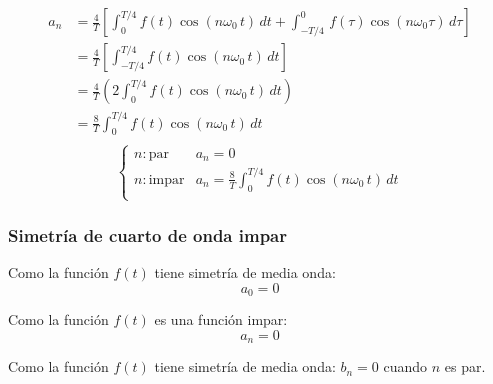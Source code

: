 \begin{equation*}
\begin{split}
    a_n
        &=\frac{4}{T}\left[
            \int_0^{T/4}f(t)\cos(n\omega_0\,t)\,dt+
            \int_{-T/4}^0\,f(\tau)\cos(n\omega_0\tau)\,d\tau
        \right]\\
        &=\frac{4}{T}\left[\int_{-T/4}^{T/4}f(t)\cos(n\omega_0\,t)\,dt\right]\\
        &=\frac{4}{T}\left(2\int_0^{T/4}f(t)\cos(n\omega_0\,t)\,dt\right)\\
        &=\frac{8}{T}\int_0^{T/4}f(t)\cos(n\omega_0\,t)\,dt\\
\end{split}
\end{equation*}
\begin{equation}
\begin{cases}
    n:\text{par}&a_n=0\\
    n:\text{impar}&a_n=\frac{8}{T}\int_0^{T/4}f(t)\cos(n\omega_0\,t)\,dt\\
\end{cases}
\end{equation}

\subsubsection{Simetría de cuarto de onda impar}
Como la función $f(t)$ tiene simetría de media onda:
\begin{equation}
    a_0=0
\end{equation}

Como la función $f(t)$ es una función impar:
\begin{equation}
    a_n=0
\end{equation}

Como la función $f(t)$ tiene simetría de media onda: $b_n=0$ cuando $n$ es par.

